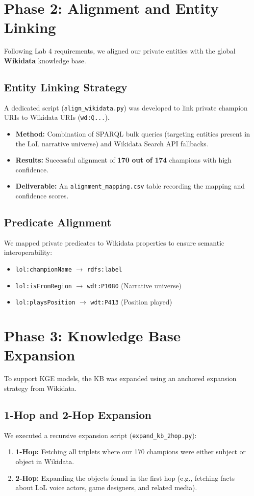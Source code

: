 \documentclass[11pt,a4paper]{article}
\begin{document}
\section{Phase 2: Alignment and Entity Linking}
Following Lab 4 requirements, we aligned our private entities with the global \textbf{Wikidata} knowledge base.

\subsection{Entity Linking Strategy}
A dedicated script (\texttt{align\_wikidata.py}) was developed to link private champion URIs to Wikidata URIs (\texttt{wd:Q...}). 
\begin{itemize}
    \item \textbf{Method:} Combination of SPARQL bulk queries (targeting entities present in the LoL narrative universe) and Wikidata Search API fallbacks.
    \item \textbf{Results:} Successful alignment of \textbf{170 out of 174} champions with high confidence.
    \item \textbf{Deliverable:} An \texttt{alignment\_mapping.csv} table recording the mapping and confidence scores.
\end{itemize}

\subsection{Predicate Alignment}
We mapped private predicates to Wikidata properties to ensure semantic interoperability:
\begin{itemize}
    \item \texttt{lol:championName} $\rightarrow$ \texttt{rdfs:label}
    \item \texttt{lol:isFromRegion} $\rightarrow$ \texttt{wdt:P1080} (Narrative universe)
    \item \texttt{lol:playsPosition} $\rightarrow$ \texttt{wdt:P413} (Position played)
\end{itemize}

\section{Phase 3: Knowledge Base Expansion}
To support KGE models, the KB was expanded using an anchored expansion strategy from Wikidata.

\subsection{1-Hop and 2-Hop Expansion}
We executed a recursive expansion script (\texttt{expand\_kb\_2hop.py}):
\begin{enumerate}
    \item \textbf{1-Hop:} Fetching all triplets where our 170 champions were either subject or object in Wikidata.
    \item \textbf{2-Hop:} Expanding the objects found in the first hop (e.g., fetching facts about LoL voice actors, game designers, and related media).
\end{enumerate}
\end{document}
